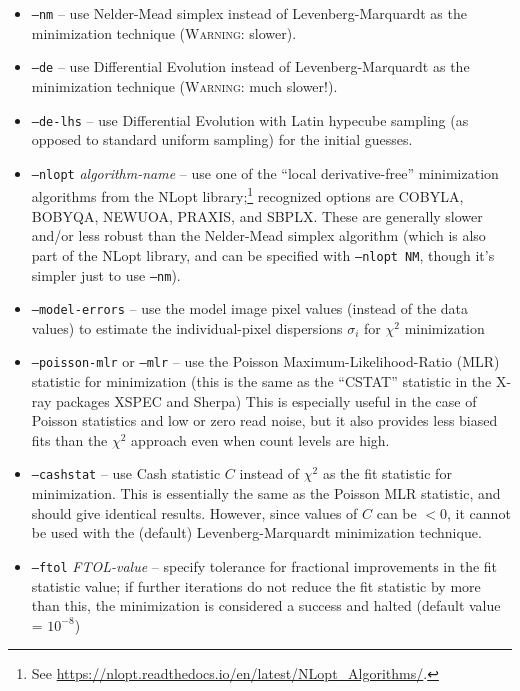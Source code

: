 \documentclass[10pt,a4paper,article]{memoir}
\newcommand{\chisquare}{\ensuremath{\chi^{2}}}
\begin{document}
\begin{itemize}
\bigskip

\item \texttt{--nm} -- use Nelder-Mead simplex instead of Levenberg-Marquardt as
the minimization technique (\textsc{Warning}: slower).

\item \texttt{--de} -- use Differential Evolution instead of Levenberg-Marquardt as
the minimization technique (\textsc{Warning}: much slower!).

\item \texttt{--de-lhs} -- use Differential Evolution with Latin hypecube sampling
(as opposed to standard uniform sampling) for the initial guesses.

\item \texttt{--nlopt} \textit{algorithm-name} -- use one of the
``local derivative-free'' minimization algorithms from the NLopt
library;\footnote{See
\url{https://nlopt.readthedocs.io/en/latest/NLopt_Algorithms/}.}
recognized options are COBYLA, BOBYQA, NEWUOA, PRAXIS, and SBPLX. These
are generally slower and/or less robust than the Nelder-Mead simplex
algorithm (which is also part of the NLopt library, and can be specified
with \texttt{--nlopt NM}, though it's simpler just to use \texttt{--nm}).

\bigskip

\item \texttt{--model-errors} -- use the model image pixel values
(instead of the data values) to estimate the individual-pixel dispersions
$\sigma_{i}$ for \chisquare{} minimization

\item \texttt{--poisson-mlr} or \texttt{--mlr} -- use the Poisson
Maximum-Likelihood-Ratio (MLR) statistic for minimization (this is the same as
the ``CSTAT'' statistic in the X-ray packages XSPEC and Sherpa) This is
especially useful in the case of Poisson statistics and low or zero read
noise, but it also provides less biased fits than the \chisquare{}
approach even when count levels are high.

\item \texttt{--cashstat} -- use Cash statistic $C$ instead of
\chisquare{} as the fit statistic for minimization. This is essentially
the same as the Poisson MLR statistic, and should give identical
results. However, since values of $C$ can be $< 0$, it cannot be used
with the (default) Levenberg-Marquardt minimization technique.

\item \texttt{--ftol} \textit{FTOL-value} -- specify tolerance for
fractional improvements in the fit statistic value; if further iterations do 
not reduce the fit statistic by more than this, the minimization is considered a 
success and halted (default value = $10^{-8}$)


\end{itemize}
\end{document}
